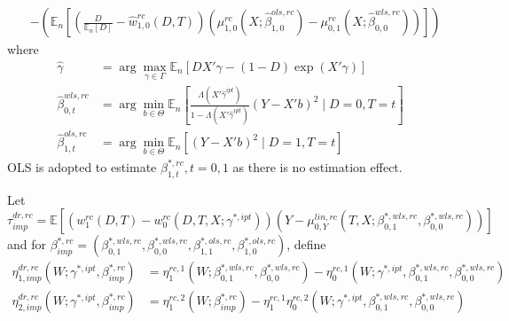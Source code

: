 \documentclass[twoside]{article}
\begin{document}
\begin{itemize}
\begin{align*}
        & - \left(\mathbb{E}_n \left[ \left( \frac{D}{\mathbb{E}_n[D]} -\hat{w}^{rc}_{1,0}(D,T) \right) \left(\mu^{rc}_{1,0}\left(X;\hat{\beta}^{ols,rc}_{1,0}\right) - \mu^{rc}_{0,1}\left(X;\hat{\beta}^{wls,rc}_{0,0}\right)\right) \right]\right)
    \end{align*}
    where 
    \begin{align*}
        \hat{\gamma} &= \arg\max_{\gamma\in\Gamma} \mathbb{E}_n \left[DX'\gamma - (1-D)\exp(X'\gamma)\right]\\
        \hat{\beta}^{wls,rc}_{0,t} &= \arg\min_{b\in\Theta} \mathbb{E}_n \left[ \frac{\Lambda \left(X'\hat{\gamma}^{ipt}\right)}{1-\Lambda \left(X'\hat{\gamma}^{ipt}\right)} (Y-X'b)^2 \mid D=0,T=t \right]\\
        \hat{\beta}^{ols,rc}_{1,t} &= \arg\min_{b\in\Theta} \mathbb{E}_n \left[ (Y-X'b)^2 \mid D=1, T=t \right]
    \end{align*}
    OLS is adopted to estimate $\beta^{*,rc}_{1,t},t=0,1$ as there is no estimation effect. 
    
    Let 
    \begin{equation*}
        \tau^{dr,rc}_{imp} = \mathbb{E}\left[ \left(w^{rc}_1(D,T) - w^{rc}_0 \left(D,T,X;\gamma^{*,ipt}\right)\right) \left(Y-\mu^{lin,rc}_{0,Y}\left(T,X;\beta^{*,wls,rc}_{0,1},\beta^{*,wls,rc}_{0,0}\right)\right) \right]
    \end{equation*}
    and for $\beta^{*,rc}_{imp}=\left(\beta^{*,wls,rc}_{0,1},\beta^{*,wls,rc}_{0,0},\beta^{*,ols,rc}_{1,1},\beta^{*,ols,rc}_{1,0}\right)$, define 
    \begin{align*}
        \eta^{dr,rc}_{1,imp}\left(W;\gamma^{*,ipt},\beta^{*,rc}_{imp}\right) &= \eta^{rc,1}_1 \left(W;\beta^{*,wls,rc}_{0,1},\beta^{*,wls,rc}_{0,0}\right) -  \eta^{rc,1}_0 \left(W;\gamma^{*,ipt},\beta^{*,wls,rc}_{0,1},\beta^{*,wls,rc}_{0,0}\right) \\
        \eta^{dr,rc}_{2,imp}\left(W;\gamma^{*,ipt},\beta^{*,rc}_{imp}\right) &= \eta^{rc,2}_1 \left(W;\beta^{*,rc}_{imp}\right) - \eta^{rc,1}_1 \eta^{rc,2}_0\left(W;\gamma^{*,ipt},\beta^{*,wls,rc}_{0,1},\beta^{*,wls,rc}_{0,0}\right)
    \end{align*}
    

\end{itemize}
\end{document}
